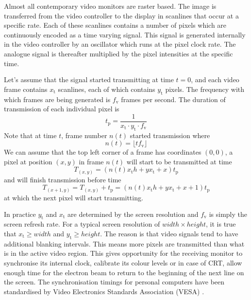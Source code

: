 \documentclass[a4paper,12pt,twoside,openright]{report}
\begin{document}
Almost all contemporary video monitors are raster based. The image is transferred from the video controller to the display in scanlines that occur at a specific rate. Each of these scanlines contains a number of pixels which are continuously encoded as a time varying signal. This signal is generated internally in the video controller by an oscillator which runs at the pixel clock rate. The analogue signal is thereafter multiplied by the pixel intensities at the specific time.

Let's assume that the signal started transmitting at time $t=0$, and each video frame contains $x_\text{t}$ scanlines, each of which contains $y_\text{t}$ pixels. The frequency with which frames are being generated is $f_\text{v}$ frames per second. The duration of transmission of each individual pixel is \begin{equation}
\label{eq:tdelta_definition}
t_\text{p}=\frac{1}{x_\text{t} \cdot y_\text{t} \cdot f_\text{v}}
\end{equation}
Note that at time $t$, frame number $n(t)$ started transmission where 
\begin{equation}
n(t)=\lfloor t f_\text{v} \rfloor
\end{equation}
We can assume that the top left corner of a frame has coordinates $(0, 0)$, a pixel at position $(x, y)$ in frame $n(t)$ will start to be transmitted at time
\begin{equation}
T_{(x,y)}= (n(t) x_\text{t} h + y x_\text{t} + x) t_\text{p}
\end{equation}
and will finish transmission before time 
\begin{equation}
T_{(x+1,y)} = T_{(x,y)} + t_\text{p} =(n(t) x_\text{t} h + y x_\text{t} + x + 1) t_\text{p}
\end{equation}
at which the next pixel will start transmitting.

In practice $y_\text{t}$ and $x_\text{t}$ are determined by the screen resolution and $f_\text{v}$ is simply the screen refresh rate. For a typical screen resolution of $width \times height$, it is true that $x_\text{t} \geq width$ and $y_\text{t} \geq height$. The reason is that video signals tend to have additional blanking intervals. This means more pixels are transmitted than what is in the active video region. This gives opportunity for the receiving monitor to synchronise its internal clock, calibrate its colour levels or in case of CRT, allow enough time for the electron beam to return to the beginning of the next line on the screen. The synchronisation timings for personal computers have been standardised by Video Electronics Standards Association (VESA) \cite{vesa}.
\end{document}
